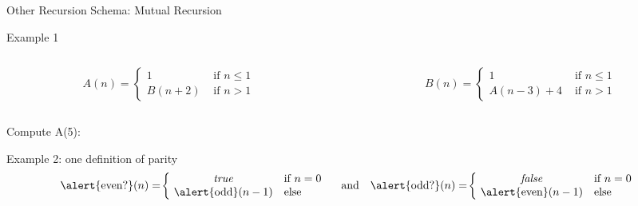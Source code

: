 \begin{Coupe}
\begin{frame}{Other Recursion Schema: \alert{Mutual Recursion}}
\bigskip

\begin{block}{Example 1}
  \begin{columns}
    \begin{column}{.4\linewidth}
      $$A(n)=\left\{
        \begin{array}{cl}
          1      &\text{ if } n\leq1\\
          B(n+2) & \text{ if } n>1
        \end{array}\right.$$  
      \end{column}
      \begin{column}{.4\linewidth}
      $$B(n)=\left\{
        \begin{array}{cl}
          1        & \text{ if } n\leq1\\
          A(n-3)+4 & \text{ if } n>1
        \end{array}\right.$$  
      \end{column}
    \end{columns}
    \medskip Compute A(5):
  \end{block}

\begin{block}{Example 2: one definition of parity}\vspace{-\baselineskip}
  $$ \mbox{\alert{even?}}(n) = \!\left \{\!%
  \begin{array}{cl}
    \mbox{\textit{true}} & \mbox{if } n = 0\\
    \mbox{\alert{odd}}(n-1) & \mbox{else}
  \end{array}
\right.
\quad \mbox{and} \quad
\mbox{\alert{odd?}}(n) = \!\left \{\!%
  \begin{array}{cl}
    \mbox{\textit{false}} & \mbox{if } n = 0\\
    \mbox{\alert{even}}(n-1) & \mbox{else}
  \end{array}
\right.
$$
\end{block}


\end{frame}
\end{Coupe}
